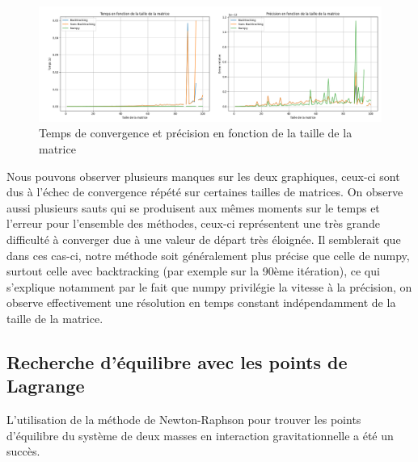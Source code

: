 \documentclass{article}
\begin{document}
\begin{figure}[H]
  \centering
  \includegraphics[width=1.1\textwidth]{time_and_precision_vs_size.png}
  \caption{Temps de convergence et précision en fonction de la taille de la matrice}
  \label{fig:performance-Newton-Raphson}
\end{figure}
Nous pouvons observer plusieurs manques sur les deux graphiques, ceux-ci sont dus à l'échec de convergence répété sur certaines tailles de matrices. On observe aussi plusieurs sauts qui se produisent aux mêmes moments sur le temps et l'erreur pour l'ensemble des méthodes, ceux-ci représentent une très grande difficulté à converger due à une valeur de départ très éloignée. Il semblerait que dans ces cas-ci, notre méthode soit généralement plus précise que celle de numpy, surtout celle avec backtracking (par exemple sur la 90ème itération), ce qui s'explique notamment par le fait que numpy privilégie la vitesse à la précision, on observe effectivement une résolution en temps constant indépendamment de la taille de la matrice.

\subsection{Recherche d'équilibre avec les points de Lagrange}
L'utilisation de la méthode de Newton-Raphson pour trouver les points d'équilibre du système de deux masses en interaction gravitationnelle a été un succès. 
\end{document}
